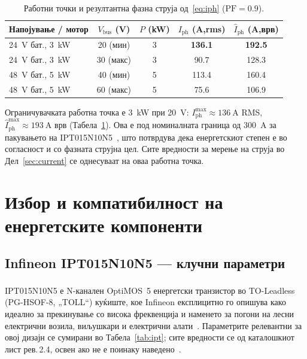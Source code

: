 \documentclass[journal,onecolumn,11pt]{IEEEtran}
\newcommand{\Vdcbus}{V_{\mathrm{bus}}}
\newcommand{\Iphrms}{I_{\mathrm{ph}}}
\begin{document}
\begin{table}[t]
\centering
\caption{Работни точки и резултантна фазна струја од~\eqref{eq:iph} ($\mathrm{PF}=0.9$).}
\label{tab:wcphase}
\small
\begin{tabular}{l c c c c}
\toprule
Напојување / мотор & \(\Vdcbus\) (V) & \(P\) (kW) & \(\Iphrms\) (A,rms) & \(\hat I_{\mathrm{ph}}\) (A,врв)\\
\midrule
\SI{24}{\volt} бат., \SI{3}{\kilo\watt} & 20 (мин) & 3 & \textbf{136.1} & \textbf{192.5}\\
\SI{24}{\volt} бат., \SI{3}{\kilo\watt} & 30 (макс) & 3 & 90.7 & 128.3\\
\SI{48}{\volt} бат., \SI{5}{\kilo\watt} & 40 (мин) & 5 & 113.4 & 160.4\\
\SI{48}{\volt} бат., \SI{5}{\kilo\watt} & 60 (макс) & 5 & 75.6 & 106.9\\
\bottomrule
\end{tabular}
\end{table}

Ограничувачката работна точка е \SI{3}{\kilo\watt} при \SI{20}{\volt}:
$\Iphrms^{\max}\approx\SI{136}{\ampere}$ RMS, $\hat I_{\mathrm{ph}}^{\max}\approx\SI{193}{\ampere}$
врв (Табела~\ref{tab:wcphase}). Ова е под номиналната граница од \SI{300}{\ampere}
за пакувањето на IPT015N10N5~\cite{ipt015part}, што потврдува дека енергетскиот
степен е во согласност и со фазната струјна цел. Сите вредности за мерење на струја
во Дел~\ref{sec:current} се однесуваат на оваа работна точка.

\section{Избор и компатибилност на енергетските компоненти}\label{sec:power}

\subsection{Infineon IPT015N10N5 --- клучни параметри}
IPT015N10N5 е N-канален OptiMOS\textsuperscript{\texttrademark}~5 енергетски
транзистор во TO-Leadless (PG-HSOF-8, „TOLL“) куќиште, кое Infineon експлицитно го
опишува како идеално за прекинување со висока фреквенција и наменето за погони на
лесни електрични возила, виљушкари и електрични алати~\cite{ipt015ds,ipt015part}.
Параметрите релевантни за овој дизајн се сумирани во Табела~\ref{tab:ipt}; сите
вредности се од каталошкиот лист рев.\,2.4, освен ако не е поинаку наведено~\cite{ipt015ds}.
\end{document}
